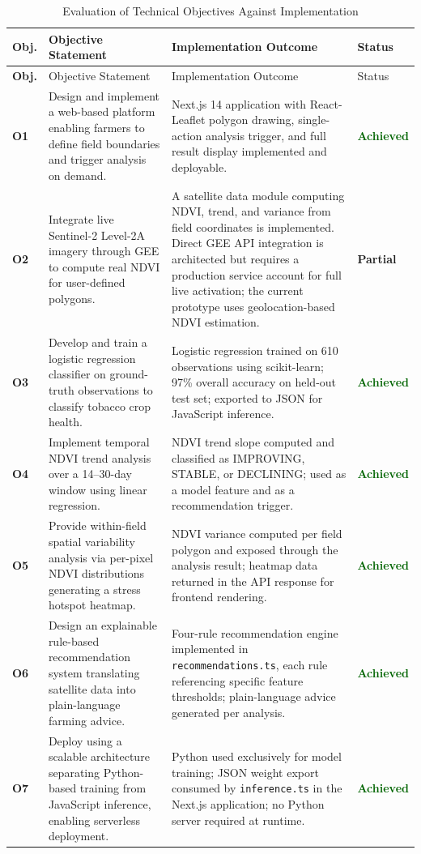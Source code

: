 \documentclass[12pt,a4paper]{report}
\begin{document}
\begin{longtable}{>{\bfseries}p{0.8cm} p{4.2cm} p{6.5cm} >{\centering\arraybackslash}p{1.5cm}}
\caption{Evaluation of Technical Objectives Against Implementation}\label{tab:objectives}\\
\toprule
Obj. & Objective Statement & Implementation Outcome & Status \\
\midrule
\endfirsthead
\toprule
Obj. & Objective Statement & Implementation Outcome & Status \\
\midrule
\endhead
\bottomrule
\endfoot
O1 & Design and implement a web-based platform enabling farmers to define field boundaries and trigger analysis on demand. & Next.js 14 application with React-Leaflet polygon drawing, single-action analysis trigger, and full result display implemented and deployable. & \textcolor{darkgreen}{\textbf{Achieved}} \\[6pt]
O2 & Integrate live Sentinel-2 Level-2A imagery through GEE to compute real NDVI for user-defined polygons. & A satellite data module computing NDVI, trend, and variance from field coordinates is implemented. Direct GEE API integration is architected but requires a production service account for full live activation; the current prototype uses geolocation-based NDVI estimation. & \textcolor{amber}{\textbf{Partial}} \\[6pt]
O3 & Develop and train a logistic regression classifier on ground-truth observations to classify tobacco crop health. & Logistic regression trained on 610 observations using scikit-learn; 97\% overall accuracy on held-out test set; exported to JSON for JavaScript inference. & \textcolor{darkgreen}{\textbf{Achieved}} \\[6pt]
O4 & Implement temporal NDVI trend analysis over a 14--30-day window using linear regression. & NDVI trend slope computed and classified as IMPROVING, STABLE, or DECLINING; used as a model feature and as a recommendation trigger. & \textcolor{darkgreen}{\textbf{Achieved}} \\[6pt]
O5 & Provide within-field spatial variability analysis via per-pixel NDVI distributions generating a stress hotspot heatmap. & NDVI variance computed per field polygon and exposed through the analysis result; heatmap data returned in the API response for frontend rendering. & \textcolor{darkgreen}{\textbf{Achieved}} \\[6pt]
O6 & Design an explainable rule-based recommendation system translating satellite data into plain-language farming advice. & Four-rule recommendation engine implemented in \texttt{recommendations.ts}, each rule referencing specific feature thresholds; plain-language advice generated per analysis. & \textcolor{darkgreen}{\textbf{Achieved}} \\[6pt]
O7 & Deploy using a scalable architecture separating Python-based training from JavaScript inference, enabling serverless deployment. & Python used exclusively for model training; JSON weight export consumed by \texttt{inference.ts} in the Next.js application; no Python server required at runtime. & \textcolor{darkgreen}{\textbf{Achieved}} \\[6pt]
\end{longtable}
\end{document}
